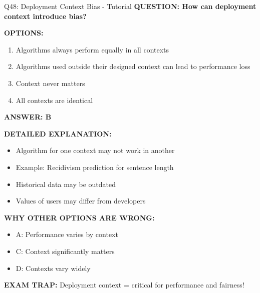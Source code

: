 \documentclass[8pt]{beamer}
\begin{document}
	\begin{frame}{Q48: Deployment Context Bias - Tutorial}
		\fontsize{6.5}{7.5}\selectfont
		\textbf{QUESTION: How can deployment context introduce bias?}
		
		\vspace{0.1cm}
		\textbf{OPTIONS:}
		\begin{enumerate}
			\item Algorithms always perform equally in all contexts
			\item Algorithms used outside their designed context can lead to performance loss
			\item Context never matters
			\item All contexts are identical
		\end{enumerate}
		
		\vspace{0.1cm}
		\textcolor{myblue}{\textbf{ANSWER: B}}
		
		\vspace{0.1cm}
		\textbf{DETAILED EXPLANATION:}
		\begin{itemize}
			\item Algorithm for one context may not work in another
			\item Example: Recidivism prediction for sentence length
			\item Historical data may be outdated
			\item Values of users may differ from developers
		\end{itemize}
		
		\vspace{0.1cm}
		\textcolor{myred}{\textbf{WHY OTHER OPTIONS ARE WRONG:}}
		\begin{itemize}
			\item \textcolor{myred}{A:} Performance varies by context
			\item \textcolor{myred}{C:} Context significantly matters
			\item \textcolor{myred}{D:} Contexts vary widely
		\end{itemize}
		
		\textcolor{myred}{\textbf{EXAM TRAP:}} Deployment context = \textcolor{myblue}{critical for performance and fairness}!
	\end{frame}
	
\end{document}
